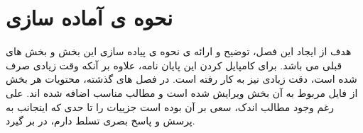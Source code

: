 \chapter{نحوه ی آماده سازی}
هدف از ایجاد این فصل، توضیح و ارائه ی نحوه ی پیاده سازی این بخش و بخش های قبلی می باشد. برای کامپایل کردن این پایان نامه، علاوه بر آنکه وقت زیادی صرف شده است، دقت زیادی نیز به کار رفته است. در فصل های گذشته، محتویات هر بخش از فایل مربوط به آن بخش ویرایش شده است و مطالب مناسب اضافه شده اند. علی رغم وجود مطالب اندک، سعی بر آن بوده است جزییات را تا حدی که اینجانب به پرسش و پاسخ بصری تسلط دارم، در بر گیرد.